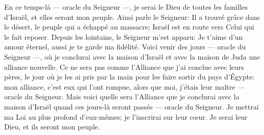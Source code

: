 En ce temps-là --- oracle du Seigneur ---,
	je serai le Dieu de toutes les familles d’Israël, et elles seront mon peuple.
Ainsi parle le Seigneur:
	Il a trouvé grâce dans le désert, le peuple qui a échappé au massacre;
	Israël est en route vers Celui qui le fait reposer.
Depuis les lointains, le Seigneur m’est apparu:
	Je t’aime d’un amour éternel, aussi je te garde ma fidélité.
Voici venir des jours --- oracle du Seigneur ---,
	où je conclurai avec la maison d’Israël et avec la maison de Juda
		une alliance nouvelle.
Ce ne sera pas comme l’Alliance que j’ai conclue avec leurs pères,
	le jour où je les ai pris par la main pour les faire sortir du pays d’Égypte:
	mon alliance, c’est eux qui l’ont rompue,
	alors que moi, j’étais leur maître --- oracle du Seigneur.
Mais voici quelle sera l’Alliance que je conclurai avec la maison d’Israël
	quand ces jours-là seront passés --- oracle du Seigneur.
Je mettrai ma Loi au plus profond d’eux-mêmes; je l’inscrirai sur leur cœur.
	Je serai leur Dieu, et ils seront mon peuple.
